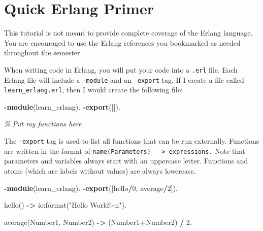 \documentclass[
]{book}
\newenvironment{Shaded}{\begin{snugshade}}{\end{snugshade}}
\newcommand{\CharTok}[1]{\textcolor[rgb]{0.31,0.60,0.02}{#1}}
\newcommand{\CommentTok}[1]{\textcolor[rgb]{0.56,0.35,0.01}{\textit{#1}}}
\newcommand{\DecValTok}[1]{\textcolor[rgb]{0.00,0.00,0.81}{#1}}
\newcommand{\FunctionTok}[1]{\textcolor[rgb]{0.00,0.00,0.00}{#1}}
\newcommand{\KeywordTok}[1]{\textcolor[rgb]{0.13,0.29,0.53}{\textbf{#1}}}
\newcommand{\OperatorTok}[1]{\textcolor[rgb]{0.81,0.36,0.00}{\textbf{#1}}}
\newcommand{\StringTok}[1]{\textcolor[rgb]{0.31,0.60,0.02}{#1}}
\newcommand{\VariableTok}[1]{\textcolor[rgb]{0.00,0.00,0.00}{#1}}
\begin{document}
\hypertarget{quick-erlang-primer}{%
\section{Quick Erlang Primer}\label{quick-erlang-primer}}

This tutorial is not meant to provide complete coverage of the Erlang language. You are encouraged to use the Erlang references you bookmarked as needed throughout the semester.

When writing code in Erlang, you will put your code into a \texttt{.erl} file. Each Erlang file will include a \texttt{-module} and an \texttt{-export} tag. If I create a file called \texttt{learn\_erlang.erl}, then I would create the following file:

\begin{Shaded}
\begin{Highlighting}[]
\KeywordTok{{-}module}\FunctionTok{(}\CharTok{learn\_erlang}\FunctionTok{).}
\KeywordTok{{-}export}\FunctionTok{([]).}

\CommentTok{\% Put my functions here}
\end{Highlighting}
\end{Shaded}

The \texttt{-export} tag is used to list all functions that can be run externally. Functions are written in the format of \texttt{name(Parameters)\ \ -\textgreater{}\ expressions.} Note that parameters and variables always start with an uppercase letter. Functions and atoms (which are labels without values) are always lowercase.

\begin{Shaded}
\begin{Highlighting}[]
\KeywordTok{{-}module}\FunctionTok{(}\CharTok{learn\_erlang}\FunctionTok{).}
\KeywordTok{{-}export}\FunctionTok{([}\CharTok{hello}\OperatorTok{/}\DecValTok{0}\FunctionTok{,} \CharTok{average}\OperatorTok{/}\DecValTok{2}\FunctionTok{]).}

\FunctionTok{hello()} \OperatorTok{{-}\textgreater{}} \FunctionTok{io:format(}\StringTok{"Hello World!\textasciitilde{}n"}\FunctionTok{).}

\FunctionTok{average(}\VariableTok{Number1}\FunctionTok{,} \VariableTok{Number2}\FunctionTok{)} \OperatorTok{{-}\textgreater{}} \FunctionTok{(}\VariableTok{Number1}\OperatorTok{+}\VariableTok{Number2}\FunctionTok{)} \OperatorTok{/} \DecValTok{2}\FunctionTok{.}
\end{Highlighting}
\end{Shaded}
\end{document}
